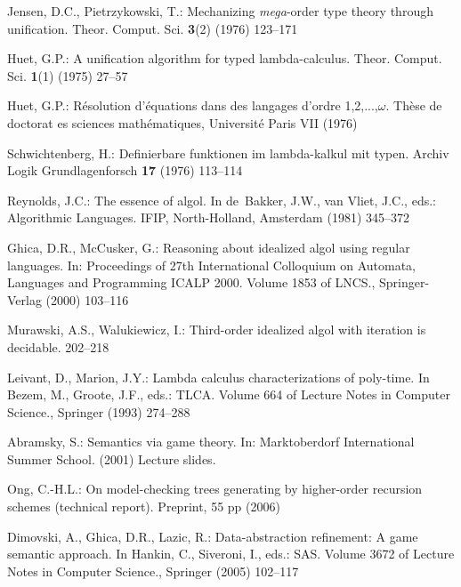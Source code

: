 \documentclass{llncs}
\begin{document}
\begin{thebibliography}{10}
Jensen, D.C., Pietrzykowski, T.:
\newblock Mechanizing {\it mega}-order type theory through unification.
\newblock Theor. Comput. Sci. \textbf{3}(2) (1976)  123--171

Huet, G.P.:
\newblock A unification algorithm for typed lambda-calculus.
\newblock Theor. Comput. Sci. \textbf{1}(1) (1975)  27--57

Huet, G.P.:
\newblock R{\'e}solution d'{\'e}quations dans des langages d'ordre
  1,2,...,$\omega$.
\newblock Th{\`e}se de doctorat es sciences math{\'e}matiques, Universit{\'e}
  Paris VII (1976)

Schwichtenberg, H.:
\newblock Definierbare funktionen im lambda-kalkul mit typen.
\newblock Archiv Logik Grundlagenforsch \textbf{17} (1976)  113--114

Reynolds, J.C.:
\newblock The essence of algol.
\newblock In de~Bakker, J.W., van Vliet, J.C., eds.: Algorithmic Languages.
\newblock IFIP, North-Holland, Amsterdam (1981)  345--372

Ghica, D.R., McCusker, G.:
\newblock Reasoning about idealized {\sc algol} using regular languages.
\newblock In: Proceedings of 27th International Colloquium on Automata,
  Languages and Programming ICALP 2000. Volume 1853 of LNCS., Springer-Verlag
  (2000)  103--116

Murawski, A.S., Walukiewicz, I.:
\newblock Third-order idealized algol with iteration is decidable.
\newblock  \cite{DBLP:conf/fossacs/2005}  202--218

Leivant, D., Marion, J.Y.:
\newblock Lambda calculus characterizations of poly-time.
\newblock In Bezem, M., Groote, J.F., eds.: TLCA. Volume 664 of Lecture Notes
  in Computer Science., Springer (1993)  274--288

Abramsky, S.:
\newblock Semantics via game theory.
\newblock In: Marktoberdorf International Summer School. (2001) Lecture slides.

Ong, C.-H.L.:
\newblock On model-checking trees generating by higher-order recursion schemes
  (technical report).
\newblock Preprint, 55 pp (2006)

Dimovski, A., Ghica, D.R., Lazic, R.:
\newblock Data-abstraction refinement: A game semantic approach.
\newblock In Hankin, C., Siveroni, I., eds.: SAS. Volume 3672 of Lecture Notes
  in Computer Science., Springer (2005)  102--117


\end{thebibliography}
\end{document}
